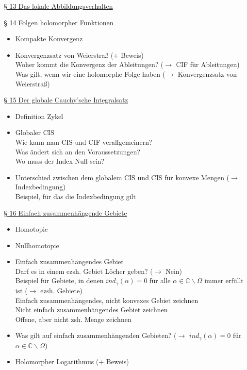 \documentclass[11pt]{article}
\newcommand{\C}{\mathbb{C}}
\begin{document}
\underline{§ 13 Das lokale Abbildungsverhalten}

\underline{§ 14 Folgen holomorpher Funktionen}
\vspace{-0.5cm}
\begin{itemize}
\item Kompakte Konvergenz
\item Konvergenzsatz von Weierstraß (+ Beweis) \\
\quad Woher kommt die Konvergenz der Ableitungen? ($\rightarrow$ CIF für Ableitungen) \\
\quad Was gilt, wenn wir eine holomorphe Folge haben ($\rightarrow$ Konvergenzsatz von Weierstraß)
\end{itemize}

\underline{§ 15 Der globale Cauchy'sche Integralsatz}
\vspace{-0.5cm}
\begin{itemize}
\item Definition Zykel
\item Globaler CIS \\
\quad Wie kann man CIS und CIF verallgemeinern? \\
\quad Was ändert sich an den Voraussetzungen? \\
\quad Wo muss der Index Null sein?
\item Unterschied zwischen dem globalem CIS und CIS für konvexe Mengen ($\rightarrow$ Indexbedingung) \\
\quad Beispiel, für das die Indexbedingung gilt
\end{itemize}

\underline{§ 16 Einfach zusammenhängende Gebiete}
\vspace{-0.5cm}
\begin{itemize}
\item Homotopie
\item Nullhomotopie
\item Einfach zusammenhängendes Gebiet \\
\quad Darf es in einem ezsh. Gebiet Löcher geben? ($\rightarrow$ Nein)\\
\quad Beispiel für Gebiete, in denen $ind_\gamma (\alpha) = 0$ für alle $\alpha \in \C \backslash \Omega$ immer erfüllt ist ($\rightarrow$ ezsh. Gebiete)\\
\quad Einfach zusammenhängendes, nicht konvexes Gebiet zeichnen \\
\quad Nicht einfach zusammenhängendes Gebiet zeichnen \\
\quad Offene, aber nicht zsh. Menge zeichnen
\item Was gilt auf einfach zusammenhängenden Gebieten? ($\rightarrow$ $ind_\gamma(\alpha) = 0$ für $\alpha \in \C \backslash \Omega$)
\item Holomorpher Logarithmus (+ Beweis)
\end{itemize}
\end{document}
